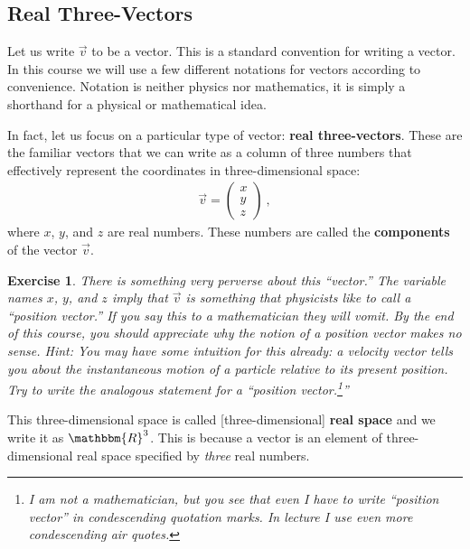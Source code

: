\documentclass[12pt]{article}
\newtheorem{exercise}{Exercise}[section]
\begin{document}
\subsection{Real Three-Vectors}

Let us write $\vec{v}$ to be a vector. This is a standard convention for writing a vector. In this course we will use a few different notations for vectors according to convenience. Notation is neither physics nor mathematics, it is simply a shorthand for a physical or mathematical idea. 

In fact, let us focus on a particular type of vector: \textbf{real three-vectors}. These are the familiar vectors that we can write as a column of three numbers that effectively represent the coordinates in three-dimensional space:
\begin{align}
    \vec{v} = 
    \begin{pmatrix}
        x\\ y\\ z
    \end{pmatrix} \ ,
\end{align}
where $x$, $y$, and $z$ are real numbers. These numbers are called the \textbf{components} of the vector $\vec{v}$.

\begin{exercise}
There is something very perverse about this ``vector.'' The variable names $x$, $y$, and $z$ imply that $\vec{v}$ is something that physicists like to call a ``position vector.'' If you say this to a mathematician they will vomit. By the end of this course, you should appreciate why the notion of a position vector makes no sense. \emph{Hint:} You may have some intuition for this already: a velocity vector tells you about the instantaneous motion of a particle relative to its present position. Try to write the analogous statement for a ``position vector.\footnote{I am not a mathematician, but you see that even I have to write ``position vector'' in condescending quotation marks. In lecture I use even more condescending air quotes.}''
\label{ex:position:vector}
\end{exercise}

This three-dimensional space is called [three-dimensional] \textbf{real space} and we write it as $\mathbbm{R}^3$. This is because a vector is an element of three-dimensional real space specified by \emph{three} real numbers. 
\end{document}
